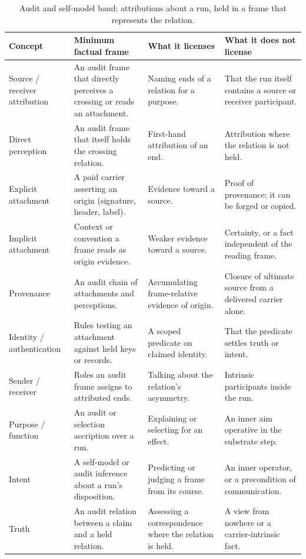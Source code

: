 \documentclass[11pt,a4paper]{article}
\theoremstyle{remark}\newtheorem{remark}[definition]{Remark}
\begin{document}
\begingroup\small
\begin{table}[t]\centering\small
\caption{Audit and self-model band: attributions about a run, held in a frame that represents the relation.}
\label{tab:band-audit}
\begin{tabular}{@{}>{\raggedright\arraybackslash}p{}>{\raggedright\arraybackslash}p{}>{\raggedright\arraybackslash}p{}>{\raggedright\arraybackslash}p{}@{}}
\toprule
\textbf{Concept} & \textbf{Minimum factual frame} & \textbf{What it licenses} & \textbf{What it does not license}\\
\midrule
Source / receiver attribution & An audit frame that directly perceives a crossing or reads an attachment. & Naming ends of a relation for a purpose. & That the run itself contains a source or receiver participant.\\
Direct perception & An audit frame that itself holds the crossing relation. & First-hand attribution of an end. & Attribution where the relation is not held.\\
Explicit attachment & A paid carrier asserting an origin (signature, header, label). & Evidence toward a source. & Proof of provenance; it can be forged or copied.\\
Implicit attachment & Context or convention a frame reads as origin evidence. & Weaker evidence toward a source. & Certainty, or a fact independent of the reading frame.\\
Provenance & An audit chain of attachments and perceptions. & Accumulating frame-relative evidence of origin. & Closure of ultimate source from a delivered carrier alone.\\
Identity / authentication & Rules testing an attachment against held keys or records. & A scoped predicate on claimed identity. & That the predicate settles truth or intent.\\
Sender / receiver & Roles an audit frame assigns to attributed ends. & Talking about the relation's asymmetry. & Intrinsic participants inside the run.\\
Purpose / function & An audit or selection ascription over a run. & Explaining or selecting for an effect. & An inner aim operative in the substrate step.\\
Intent & A self-model or audit inference about a run's disposition. & Predicting or judging a frame from its course. & An inner operator, or a precondition of communication.\\
Truth & An audit relation between a claim and a held relation. & Assessing a correspondence where the relation is held. & A view from nowhere or a carrier-intrinsic fact.\\

\end{tabular}
\end{table}
\end{document}
